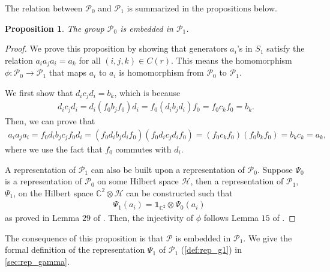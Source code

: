 \documentclass[11pt,letterpaper]{article}
\newcommand{\x}{\otimes}
\newcommand{\C}{\mathbb{C}}
\newcommand{\calH}{\mathcal{H}}
\newcommand{\1}{\mathbb{1}}
\newcommand{\Pg}{\mathcal{P}}
\newtheorem{proposition}[theorem]{Proposition}
\theoremstyle{definition}
\begin{document}
The relation between $\Pg_0$ and $\Pg_1$ is summarized in the propositions below.
\begin{proposition}
    \label{prop:g0g1}
	The group $\Pg_0$ is embedded in $\Pg_1$. 
\end{proposition}
\begin{proof}
    We prove this proposition by showing that generators $a_i$'s in $S_1$
    satisfy the relation $a_i a_j a_i = a_k$ for all $(i,j,k) \in C(r)$.
    This means the homomorphism $\phi: \Pg_0 \rightarrow \Pg_1$ that maps $a_i$
    to $a_i$ is homomorphism from $\Pg_0$ to $\Pg_1$. 
   
	We first show that $d_i c_j d_i = b_k$, which is because
	\begin{align*}
		d_i c_j d_i = d_i (f_0 b_j f_0) d_i = f_0 (d_i b_j d_i) f_0 = f_0 c_k f_0 = b_k.
	\end{align*}
	Then, we can prove that 
	\begin{align*}
		a_i a_j a_i = f_0 d_i b_j c_j f_0 d_i 
		= (f_0 d_i b_j d_i f_0)(f_0 d_i c_j d_i f_0) 
		= (f_0 c_k f_0)(f_0 b_k f_0) 
		= b_k c_k = a_k,
	\end{align*}
	where we use the fact that $f_0$ commutes with $d_i$.
	
	A representation of $\Pg_1$ can also be built upon a representation of $\Pg_0$.
    Suppose $\Psi_0$ is a representation of $\Pg_0$ on some Hilbert space $\calH$, then 
    a representation of $\Pg_1$, $\Psi_1$, on the Hilbert space $\C^2 \x \calH$ can
    be constructed such that
    \begin{align*}
        &\Psi_1(a_i) = \1_{\C^2} \x \Psi_0(a_i)
    \end{align*}
    as proved in Lemma $29$ of \cite{slofstra2017}.
    Then, the injectivity of $\phi$ follows Lemma $15$ of \cite{slofstra2017}.
\end{proof}
The consequence of this proposition is that $\Pg$ is embedded in $\Pg_1$.
We give the formal definition of the representation $\Psi_1$ of $\Pg_1$ 
(\cref{def:rep_g1}) in \cref{sec:rep_gamma}.



\end{document}
